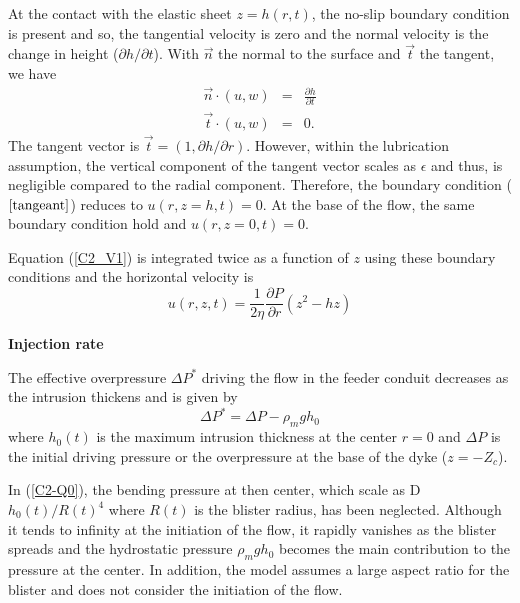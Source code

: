 At the contact with the elastic sheet $z=h(r,t)$, the no-slip boundary
condition is present  and so, the tangential velocity is  zero and the
normal velocity  is the change  in height ($\partial h/  \partial t$).
With $\vec{n}$ the normal to the surface and $\vec{t}$ the tangent, we
have
\begin{eqnarray}
  \vec{n} \cdot (u,w) &=& \frac{\partial h }{\partial t}\\
  \vec{t} \cdot (u,w) &=& 0 \label{tangeant}.
\end{eqnarray}
The  tangent  vector is  $\vec{t}  =  (1,  \partial h/  \partial  r)$.
However, within the lubrication  assumption, the vertical component of
the  tangent  vector scales  as  $\epsilon$  and thus,  is  negligible
compared to  the radial  component. Therefore, the  boundary condition
($\ref{tangeant}$) reduces  to $u(r,z=h,t)  =0$.  At  the base  of the
flow, the same boundary condition hold and $u(r,z=0,t) =0$.

Equation (\ref{C2_V1}) is integrated twice  as a function of $z$ using
these boundary conditions and the horizontal velocity is
\begin{equation}
  u(r,z,t) =\frac{1}{2\eta} \frac{\partial P}{\partial r} \left(z^2-hz\right)
  \label{C2-vel}
\end{equation}

\vspace{.5cm} \textbf{Injection rate} \vspace{.5cm}

The effective overpressure $\Delta P^*$ driving the flow in the feeder
conduit decreases as the intrusion thickens and is given by
\begin{equation}
  \Delta P^* = \Delta P -\rho_m g h_0 \label{C2-Q0}
\end{equation}
where $h_0(t)$ is the maximum  intrusion thickness at the center $r=0$
and $\Delta P$ is the initial  driving pressure or the overpressure at
the base of the dyke ($z = -Z_c$).

In (\ref{C2-Q0}), the bending pressure  at then center, which scale as
D$h_0(t)/R(t)^4$  where  $R(t)$  is   the  blister  radius,  has  been
neglected.  Although  it tends  to infinity at  the initiation  of the
flow, it rapidly  vanishes as the blister spreads  and the hydrostatic
pressure $\rho_m g h_0$ becomes  the main contribution to the pressure
at the  center.  In addition, the  model assumes a large  aspect ratio
for the blister and does not consider the initiation of the flow.


